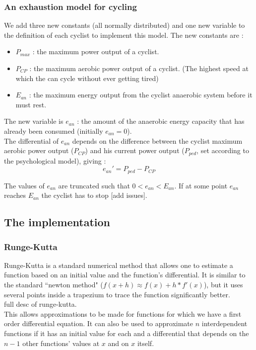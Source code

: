 \documentclass[10pt, a4paper]{report}
\begin{document}
\subsubsection{An exhaustion model for cycling}

We add three new constants (all normally distributed) and one new variable to the definition of each cyclist to implement this model. The new constants are :
\begin{itemize}
\item $P_{max}$ : the maximum power output of a cyclist.
\item $P_{CP}$ : the maximum aerobic power output of a cyclist. (The highest speed at which the can cycle without ever getting tired)
\item $E_{an}$ : the maximum energy output from the cyclist anaerobic system before it must rest.
\end{itemize}
The new variable is $e_{an}$ : the amount of the anaerobic energy capacity that has already been consumed (initially $e_{an} = 0$). \\

The differential of $e_{an}$ depends on the difference between the cyclist maximum aerobic power output ($P_{CP}$) and his current power output ($P_{ped}$, set according to the psychological model), giving :
$$ e_{an}' = P_{ped} - P_{CP} $$

The values of $e_{an}$ are truncated such that $0 < e_{an} < E_{an}$. If at some point $e_{an}$ reaches $E_{an}$ the cyclist has to stop [add issues].

\subsection{The implementation}\label{subsec:impl}

\subsubsection{Runge-Kutta}


Runge-Kutta is a standard numerical method that allows one to estimate a function based on an initial value and the function's differential. It is similar to the standard ``newton method" ($f(x + h) \approx f(x) + h*f'(x)$), but it uses several points inside a trapezium to trace the function significantly better. \\ %
\newline
full desc of runge-kutta.\\
\newline
This allows approximations to be made for functions for which we have a first order differential equation. It can also be used to approximate $n$ interdependent functions if it has an initial value for each and a differential that depends on the $n - 1$ other functions' values at $x$ and on $x$ itself.\\
\end{document}

